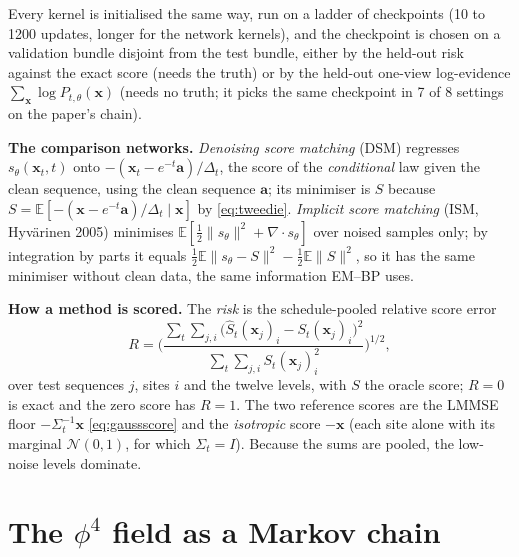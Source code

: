 Every kernel is initialised the same way, run on a ladder of checkpoints (10 to 1200 updates, longer for the network kernels), and the checkpoint is chosen on a validation bundle disjoint from the test bundle, either by the held-out risk against the exact score (needs the truth) or by the
held-out one-view log-evidence $\sum_{\mathbf x}\log P_{t,\theta}(\mathbf x)$ (needs no truth; it picks the same checkpoint in 7 of 8 settings on the paper's chain).

\textbf{The comparison networks.} \emph{Denoising score matching} (DSM) regresses $s_\theta(\mathbf x_t,t)$ onto $-(\mathbf x_t-e^{-t}\mathbf a)/\Delta_t$, the score of the \emph{conditional} law given the clean sequence, using the clean sequence $\mathbf a$; its minimiser is $S$ because $S=\mathbb E[-(\mathbf x-e^{-t}\mathbf a)/\Delta_t\mid\mathbf x]$ by \eqref{eq:tweedie}.
\emph{Implicit score matching} (ISM, Hyv\"arinen 2005) minimises $\mathbb E[\tfrac12\|s_\theta\|^2+\nabla\!\cdot s_\theta]$ over noised samples only; by integration by parts it equals $\tfrac12\mathbb E\|s_\theta-S\|^2-\tfrac12\mathbb E\|S\|^2$, so it has the same minimiser without clean data, the same information EM--BP uses.

\textbf{How a method is scored.} The \emph{risk} is the schedule-pooled relative score error
\begin{equation}\label{eq:risk}
R=\Big(\frac{\sum_t\sum_{j,i}\big(\hat S_t(\mathbf x_j)_i-S_t(\mathbf x_j)_i\big)^2}{\sum_t\sum_{j,i}S_t(\mathbf x_j)_i^2}\Big)^{1/2},
\end{equation}
over test sequences $j$, sites $i$ and the twelve levels, with $S$ the oracle score; $R=0$ is exact and the zero score has $R=1$. The two reference scores are the LMMSE floor $-\Sigma_t^{-1}\mathbf x$ \eqref{eq:gaussscore} and the \emph{isotropic} score $-\mathbf x$ (each site alone with its marginal $\mathcal N(0,1)$, for which $\Sigma_t=I$).
Because the sums are pooled, the low-noise levels dominate.

\section{The $\phi^4$ field as a Markov chain}

